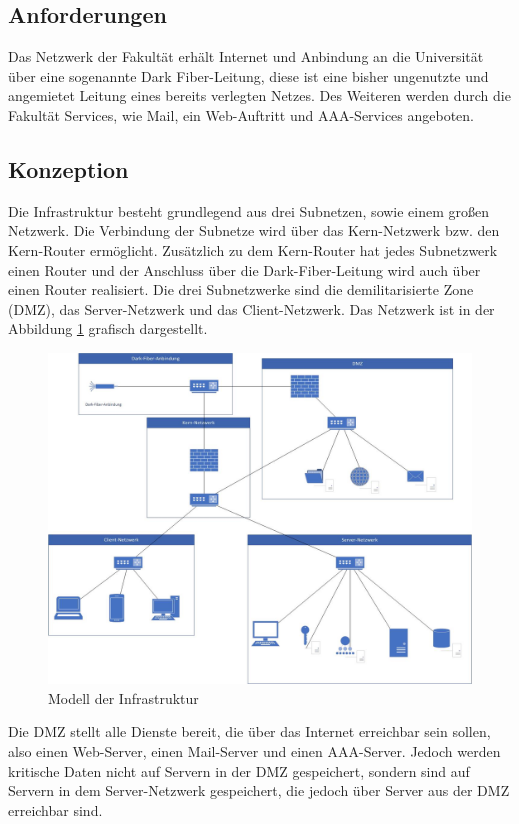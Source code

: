 \documentclass[a4paper]{article}
\begin{document}
\subsection{Anforderungen}
Das Netzwerk der Fakultät erhält Internet und Anbindung an die Universität über eine sogenannte Dark Fiber-Leitung, diese ist eine bisher ungenutzte und angemietet Leitung eines bereits verlegten Netzes. Des Weiteren werden durch die Fakultät Services, wie Mail, ein Web-Auftritt und AAA-Services angeboten.

\subsection{Konzeption}
Die Infrastruktur besteht grundlegend aus drei Subnetzen, sowie einem großen Netzwerk. Die Verbindung der Subnetze wird über das Kern-Netzwerk bzw. den Kern-Router ermöglicht. Zusätzlich zu dem Kern-Router hat jedes Subnetzwerk einen Router und der Anschluss über die Dark-Fiber-Leitung wird auch über einen Router realisiert. Die drei Subnetzwerke sind die demilitarisierte Zone (DMZ), das Server-Netzwerk und das Client-Netzwerk. Das Netzwerk ist in der Abbildung \ref{fig:model} grafisch dargestellt.

\begin{figure}[H]
  \includegraphics[width=\linewidth]{pictures/netzwerk-diagramm.jpg}
  \caption{Modell der Infrastruktur}
  \label{fig:model}
\end{figure}

Die DMZ stellt alle Dienste bereit, die über das Internet erreichbar sein sollen, also einen Web-Server, einen Mail-Server und einen AAA-Server. Jedoch werden kritische Daten nicht auf Servern in der DMZ gespeichert, sondern sind auf Servern in dem Server-Netzwerk gespeichert, die jedoch über Server aus der DMZ erreichbar sind.
\end{document}
